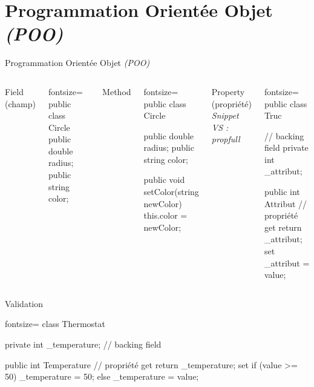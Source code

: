 \section{Programmation Orientée Objet \emph{(POO)}}

\begingroup
{}
\begin{frame}
    \begin{center}
        \vspace{1cm}
        {\Large Programmation Orientée Objet \emph{(POO)}}
    \end{center}
\end{frame}
\endgroup

\begin{frame}[fragile]
  \begin{columns}[c]
    \column{2.3in}
    \begin{center}{\large Field (champ)}\end{center}
    \begin{csharpcode*}{fontsize=\scriptsize}
public class Circle
{
    public double radius;
    public string color;
}
    \end{csharpcode*}
    \pause
    \begin{center}{\large Method}\end{center}
    \begin{csharpcode*}{fontsize=\scriptsize}
public class Circle
{
    public double radius;
    public string color;

    public void setColor(string newColor)
    {
      this.color = newColor;
    }
}
    \end{csharpcode*}
    \pause
    \column{2.2in}
    \begin{center}
      {\large Property (propriété)}\\
      \emph{\scriptsize Snippet VS : propfull}
    \end{center}
    \begin{csharpcode*}{fontsize=\scriptsize}
public class Truc
{
    // backing field
    private int _attribut;

    public int Attribut // propriété
    {
        get { return _attribut; }
        set { _attribut = value; }
    }
}
    \end{csharpcode*}
  \end{columns}
\end{frame}

\begin{frame}[fragile]
    \begin{center}{\large Validation}\end{center}
    \begin{csharpcode*}{fontsize=\scriptsize}
class Thermostat
{
    private int _temperature; // backing field

    public int Temperature // propriété
    {
        get { return _temperature; }
        set
        {
            if (value >= 50)
                _temperature = 50;
            else
                _temperature = value;
        }
    }
}
    \end{csharpcode*}
\end{frame}

